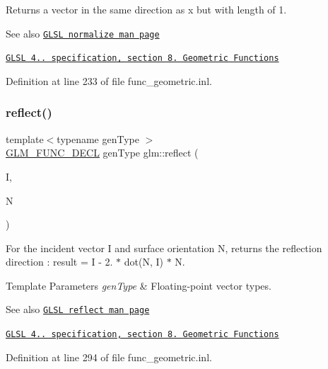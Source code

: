 Returns a vector in the same direction as x but with length of 1.

\begin{DoxySeeAlso}{See also}
\href{http://www.opengl.org/sdk/docs/manglsl/xhtml/normalize.xml}{\tt G\+L\+SL normalize man page} 

\href{http://www.opengl.org/registry/doc/GLSLangSpec.4.20.8.pdf}{\tt G\+L\+SL 4.. specification, section 8. Geometric Functions} 
\end{DoxySeeAlso}


Definition at line 233 of file func\+\_\+geometric.\+inl.

\mbox{\label{group__core__func__geometric_gab63646fc36b81cf69d3ce123a72f76f2}} 
\subsubsection{\texorpdfstring{reflect()}{reflect()}}
{\footnotesize\ttfamily template$<$typename gen\+Type $>$ \\
\hyperlink{setup_8hpp_ab2d052de21a70539923e9bcbf6e83a51}{G\+L\+M\+\_\+\+F\+U\+N\+C\+\_\+\+D\+E\+CL} gen\+Type glm\+::reflect (\begin{DoxyParamCaption}\item[{gen\+Type const \&}]{I,  }\item[{gen\+Type const \&}]{N }\end{DoxyParamCaption})}

For the incident vector I and surface orientation N, returns the reflection direction \+: result = I -\/ 2. $\ast$ dot(\+N, I) $\ast$ N.


\begin{DoxyTemplParams}{Template Parameters}
{\em gen\+Type} & Floating-\/point vector types.\\
\hline
\end{DoxyTemplParams}
\begin{DoxySeeAlso}{See also}
\href{http://www.opengl.org/sdk/docs/manglsl/xhtml/reflect.xml}{\tt G\+L\+SL reflect man page} 

\href{http://www.opengl.org/registry/doc/GLSLangSpec.4.20.8.pdf}{\tt G\+L\+SL 4.. specification, section 8. Geometric Functions} 
\end{DoxySeeAlso}


Definition at line 294 of file func\+\_\+geometric.\+inl.

